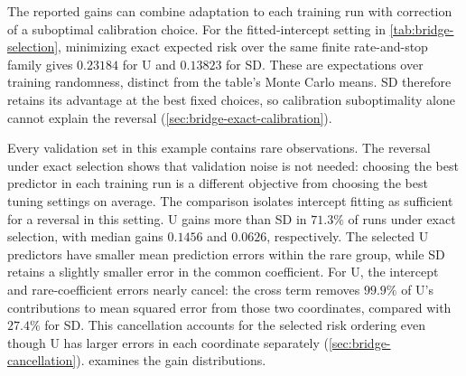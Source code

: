 \documentclass{alt2027}
\begin{document}
The reported gains can combine adaptation to each training run with correction
of a suboptimal calibration choice. For the fitted-intercept setting in
\cref{tab:bridge-selection}, minimizing exact expected risk over the same finite
rate-and-stop family gives $0.23184$ for U and $0.13823$ for SD\@. These are
expectations over training randomness, distinct from the table's Monte Carlo
means. SD therefore retains its advantage at the best fixed choices, so
calibration suboptimality alone cannot explain the reversal
(\cref{sec:bridge-exact-calibration}).

Every validation set in this example contains rare observations. The reversal
under exact selection shows that validation noise is not needed: choosing the
best predictor in each training run is a different objective from choosing the
best tuning settings on average. The comparison isolates intercept fitting as
sufficient for a reversal in this setting. U gains more than SD in $71.3\%$ of
runs under exact selection, with median gains $0.1456$ and $0.0626$,
respectively. The selected U predictors have smaller mean prediction errors
within the rare group, while SD retains a slightly smaller error in the common
coefficient. For U, the intercept and rare-coefficient errors nearly cancel: the
cross term removes $99.9\%$ of U's contributions to mean squared error from
those two coordinates, compared with $27.4\%$ for SD\@. This cancellation
accounts for the selected risk ordering even though U has larger errors in each
coordinate separately (\cref{sec:bridge-cancellation}). 
examines the gain distributions.
\end{document}
